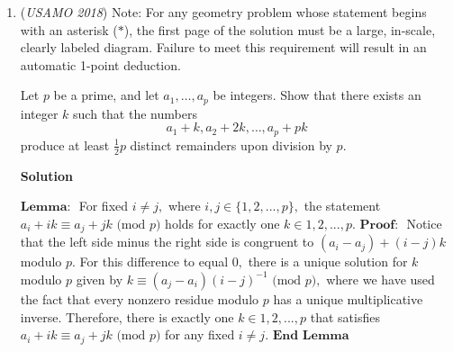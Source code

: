 \begin{enumerate}
ps+b|| $\phi$(nq). Let {a1, . . . , am} be a complete reduced residue set modulo n. Thecomplete reduced residue set modulo nq consists of the mq numbers{a1, . . . , am, n + a1, . . . , n + am, . . . , n(q - 1) + a1, . . . , n(q - 1) + am}with the m elements {qa1, qa2, . . . , qam} removed.The new sum of k-th powers is equal toak1 + · · · + akm + · · · + (n(q - 1) + a1)k + · · · + (n(q - 1) + am)k - qk(ak1 + · · · + akm) =mnk1k + · · · + (q - 1)k+k1nk-11k-1 + · · · + (q - 1)k-1(a1 + · · · + am) + · · ·· · · +kk - 1n (1 + · · · + (q - 1)) (ak-11 + · · · + ak-1m ) + q(ak1 + · · · + akm) - qk(ak1 + · · · + akm).Each termkjnk-j1k-j + · · · + (q - 1)k-j(aj1 + · · · + ajm),for 0 $\leq$ j $\leq$ k - 1, is divisible by ps+b because p | nk-j, ps| aj1 + · · · + ajm, and pb-1| 1k-j + · · · +(q - 1)k-j by Lemma 1.Also (qk - q)(ak1 + · · · + akm) is divisible by ps+b because pb| q - 1 | qk - q and ps| ak1 + · · · + akm.Thus ps+b divides our sum and our proof is complete.Remark. In fact, one can also show the converse statement: if {a1, a2, . . . , am} is as defined inthe problem and ak1 + ak2 + · · · + akm is divisible by m for every positive integer k, then every primethat divides m also divides n.

 


	\item (\textit{USAMO 2018}) Note: For any geometry problem whose statement begins with an asterisk ($*$), the first page of the solution must be a large, in-scale, clearly labeled diagram. Failure to meet this requirement will result in an automatic 1-point deduction.


 Let $p$ be a prime, and let $a_1, \dots, a_p$ be integers. Show that there exists an integer $k$ such that the numbers 
 \[a_1 + k, a_2 + 2k, \dots, a_p + pk\]produce at least $\frac{1}{2} p$ distinct remainders upon division by $p$.


 



\textbf{Solution}

$\textbf{Lemma: }$ For fixed $i\neq j,$ where $i, j\in\{1, 2, ..., p\},$ the statement $a_i + ik\equiv a_j + jk\text{ (mod } p\text{)}$ holds for exactly one $k\in {1, 2, ..., p}.$
$\textbf{Proof: }$ Notice that the left side minus the right side is congruent to $(a_i - a_j) + (i - j)k$ modulo $p.$ For this difference to equal $0,$ there is a unique solution for $k$ modulo $p$ given by $k\equiv (a_j - a_i)(i - j)^{-1}\text{ (mod } p\text{)},$ where we have used the fact that every nonzero residue modulo $p$ has a unique multiplicative inverse. Therefore, there is exactly one $k\in {1, 2, ..., p}$ that satisfies $a_i + ik\equiv a_j + jk\text{ (mod } p\text{)}$ for any fixed $i\neq j. \textbf{ End Lemma}$


\end{enumerate}
